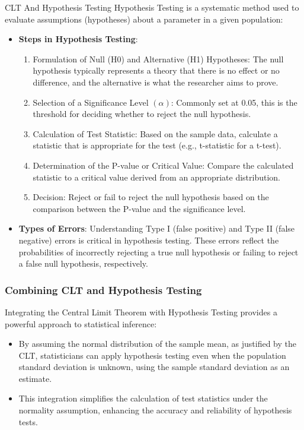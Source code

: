 \begin{notes}{CLT And Hypothesis Testing}
    Hypothesis Testing is a systematic method used to evaluate assumptions (hypotheses) about a parameter in a given population:
    \begin{itemize}
        \item \textbf{Steps in Hypothesis Testing}: 
            \begin{enumerate}
                \item Formulation of Null (H0) and Alternative (H1) Hypotheses: The null hypothesis typically represents a theory that there is no effect or no difference, and the alternative is what 
                the researcher aims to prove.
                \item Selection of a Significance Level $(\alpha)$: Commonly set at 0.05, this is the threshold for deciding whether to reject the null hypothesis.
                \item Calculation of Test Statistic: Based on the sample data, calculate a statistic that is appropriate for the test (e.g., t-statistic for a t-test).
                \item Determination of the P-value or Critical Value: Compare the calculated statistic to a critical value derived from an appropriate distribution.
                \item Decision: Reject or fail to reject the null hypothesis based on the comparison between the P-value and the significance level.
            \end{enumerate}
        \item \textbf{Types of Errors}: Understanding Type I (false positive) and Type II (false negative) errors is critical in hypothesis testing. These errors reflect the probabilities of incorrectly 
        rejecting a true null hypothesis or failing to reject a false null hypothesis, respectively.
    \end{itemize}
    
    \subsubsection*{Combining CLT and Hypothesis Testing}
    
    Integrating the Central Limit Theorem with Hypothesis Testing provides a powerful approach to statistical inference:
    \begin{itemize}
        \item By assuming the normal distribution of the sample mean, as justified by the CLT, statisticians can apply hypothesis testing even when the population standard deviation is unknown, using 
        the sample standard deviation as an estimate.
        \item This integration simplifies the calculation of test statistics under the normality assumption, enhancing the accuracy and reliability of hypothesis tests.
    \end{itemize}
    

\end{notes}
